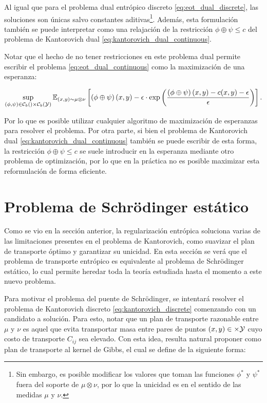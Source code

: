 Al igual que para el problema dual entrópico discreto \eqref{eq:eot_dual_discrete}, las soluciones son únicas salvo constantes aditivas\footnote{Sin embargo, es posible modificar los valores que toman las funciones $\phi^*$ y $\psi^*$ fuera del soporte de $\mu\otimes\nu$, por lo que la unicidad es en el sentido de las medidas $\mu$ y $\nu$.}. Además, esta formulación también se puede interpretar como una relajación de la restricción $\phi\oplus\psi\leq c$ del problema de Kantorovich dual \eqref{eq:kantorovich_dual_continuous}.

Notar que el hecho de no tener restricciones en este problema dual permite escribir el problema \eqref{eq:eot_dual_continuous} como la maximización de una esperanza:

\begin{equation*}
	\sup_{(\phi,\psi)\in \mathcal{C}_b\left(\right)\times \mathcal{C}_b\left(\mathcal{Y}\right)}
	\mathbb{E}_{(x,y)\sim \mu\otimes\nu}\left[\left(\phi\oplus\psi\right)(x,y) - \epsilon\cdot \exp\left(\frac{\left(\phi\oplus\psi\right)(x,y) - c(x,y) - \epsilon}{\epsilon}\right)\right].
\end{equation*}

Por lo que es posible utilizar cualquier algoritmo de maximización de esperanzas para resolver el problema. Por otra parte, si bien el problema de Kantorovich dual \eqref{eq:kantorovich_dual_continuous} también se puede escribir de esta forma, la restricción $\phi\oplus\psi\leq c$ se suele introducir en la esperanza mediante otro problema de optimización, por lo que en la práctica no es posible maximizar esta reformulación de forma eficiente.

\section{Problema de Schrödinger estático}
\label{eot_sbp/static_sbp}

Como se vio en la sección anterior, la regularización entrópica soluciona varias de las limitaciones presentes en el problema de Kantorovich, como suavizar el plan de transporte óptimo y garantizar su unicidad. En esta sección se verá que el problema de transporte entrópico es equivalente al problema de Schrödinger estático, lo cual permite heredar toda la teoría estudiada hasta el momento a este nuevo problema.

Para motivar el problema del puente de Schrödinger, se intentará resolver el problema de Kantorovich discreto \eqref{eq:kantorovich_discrete} comenzando con un candidato a solución. Para esto, notar que un plan de transporte razonable entre $\mu$ y $\nu$ es aquel que evita transportar masa entre pares de puntos $(x,y)\in\times\mathcal{Y}$ cuyo costo de transporte $C_{ij}$ sea elevado. Con esta idea, resulta natural proponer como plan de transporte al kernel de Gibbs, el cual se define de la siguiente forma:

